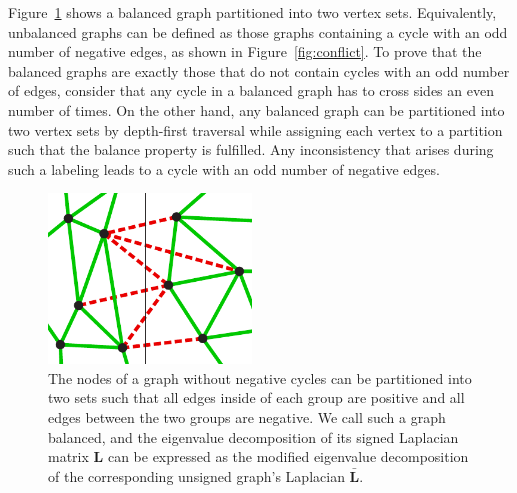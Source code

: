 \documentclass[11pt,a4paper]{book}
\newcommand{\wTwo}{0.48}
\begin{document}
Figure~\ref{fig:balance} shows a balanced graph partitioned into two
vertex sets.  Equivalently, unbalanced graphs can be defined as those
graphs containing a cycle with an odd number of negative edges,
as shown in Figure~\ref{fig:conflict}. 
To prove that the balanced graphs are exactly those that do not
contain cycles with an odd number of edges, consider that any cycle in a
balanced graph has to cross sides an even number of times.  On
the other hand, any balanced graph can be partitioned into two
vertex sets by depth-first traversal while assigning each vertex to 
a partition such that the balance property is fulfilled.  Any
inconsistency that arises during such a labeling leads to a cycle with
an odd number of negative edges. 

\begin{figure}[h!]
  \centering
  \includegraphics[width=\wTwo\textwidth]{img-svg/balance}
  \caption{
    The nodes of a graph without negative cycles
    can be partitioned into two sets such that all edges
    inside of each group are positive and all edges between the two
    groups are negative. 
    We call such a graph balanced, and the eigenvalue decomposition
    of its signed Laplacian matrix $\mathbf L$ can be expressed as the modified
    eigenvalue decomposition of the corresponding unsigned graph's
    Laplacian $\mathbf{\bar L}$. 
  }
  \label{fig:balance}
\end{figure}
\end{document}
